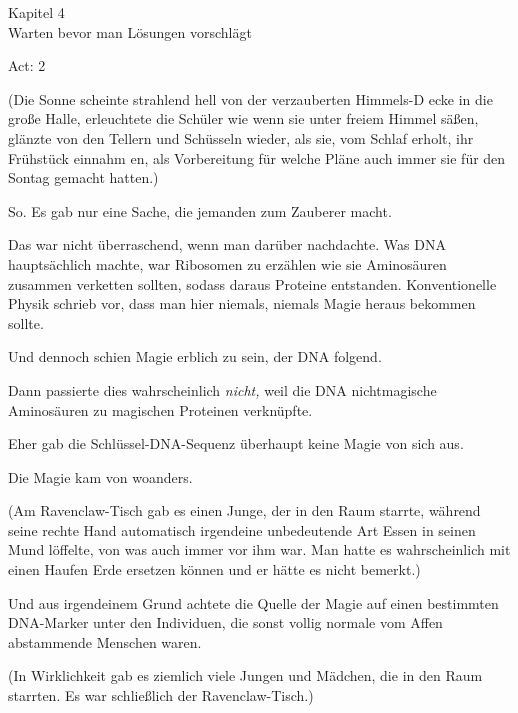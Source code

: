 

\hypertarget{warten-bevor-man-luxf6sungen-vorschluxe4gt}{%

Kapitel 4\\ Warten bevor man Lösungen vorschlägt

Act: 2

(Die Sonne scheinte strahlend hell von der verzauberten Himmels-D ecke in die große Halle, erleuchtete die Schüler wie wenn sie unter freiem Himmel säßen, glänzte von den Tellern und Schüsseln wieder, als sie, vom Schlaf erholt, ihr Frühstück einnahm en, als Vorbereitung für welche Pläne auch immer sie für den Sontag gemacht hatten.)

So. Es gab nur eine Sache, die jemanden zum Zauberer macht.

Das war nicht überraschend, wenn man darüber nachdachte. Was DNA hauptsächlich machte, war Ribosomen zu erzählen wie sie Aminosäuren zusammen verketten sollten, sodass daraus Proteine entstanden. Konventionelle Physik schrieb vor, dass man hier niemals, niemals Magie heraus bekommen sollte.

Und dennoch schien Magie erblich zu sein, der DNA folgend.

Dann passierte dies wahrscheinlich \emph{nicht,} weil die DNA nichtmagische Aminosäuren zu magischen Proteinen verknüpfte.

Eher gab die Schlüssel-DNA-Sequenz überhaupt keine Magie von sich aus.

Die Magie kam von woanders.

(Am Ravenclaw-Tisch gab es einen Junge, der in den Raum starrte, während seine rechte Hand automatisch irgendeine unbedeutende Art Essen in seinen Mund löffelte, von was auch immer vor ihm war. Man hatte es wahrscheinlich mit einen Haufen Erde ersetzen können und er hätte es nicht bemerkt.)

Und aus irgendeinem Grund achtete die Quelle der Magie auf einen bestimmten DNA-Marker unter den Individuen, die sonst vollig normale vom Affen abstammende Menschen waren.

(In Wirklichkeit gab es ziemlich viele Jungen und Mädchen, die in den Raum starrten. Es war schließlich der Ravenclaw-Tisch.)

}
